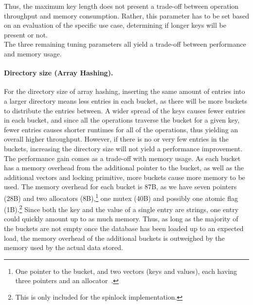 \documentclass[11pt]{article} %
\begin{document}
Thus, the maximum key length does not present a trade-off between operation throughput and memory consumption. Rather, this parameter has to be set based on an evaluation of the specific use case, determining if longer keys will be present or not.\\

The three remaining tuning parameters all yield a trade-off between performance and memory usage. 
\paragraph{Directory size (Array Hashing).} For the directory size of array hashing, inserting the same amount of entries into a larger directory means less entries in each bucket, as there will be more buckets to distribute the entries between. A wider spread of the keys causes fewer entries in each bucket, and since all the operations traverse the bucket for a given key, fewer entries causes shorter runtimes for all of the operations, thus yielding an overall higher throughput. However, if there is no or very few entries in the buckets, increasing the directory size will not yield a performance improvement.\\

The performance gain comes as a trade-off with memory usage. As each bucket has a memory overhead from the additional pointer to the bucket, as well as the additional vectors and locking primitive, more buckets cause more memory to be used. The memory overhead for each bucket is 87B, as we have seven pointers (28B) and two allocators (8B),\footnote{One pointer to the bucket, and two vectors (keys and values), each having three pointers and an allocator~\cite{vector}.} one mutex (40B) and possibly one atomic flag (1B).\footnote{This is only included for the spinlock implementation.} Since both the key and the value of a single entry are strings, one entry could quickly amount up to as much memory. Thus, as long as the majority of the buckets are not empty once the database has been loaded up to an expected load, the memory overhead of the additional buckets is outweighed by the memory used by the actual data stored.\\
\end{document}
